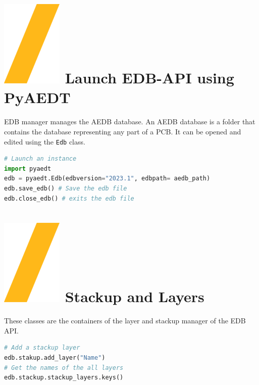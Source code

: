 \documentclass[landscape]{article}
\begin{document}
\begin{multicols}{3}
\setlength{\premulticols}{1pt}
\setlength{\postmulticols}{1pt}
\setlength{\multicolsep}{1pt}
\setlength{\columnsep}{2pt}

\section{\includegraphics[height=\fontcharht\font`\S]{slash.png} Launch EDB-API using PyAEDT}
\justifying
EDB manager manages the AEDB database. An AEDB database is a folder that contains the database representing any part of a PCB. It can be opened and edited using the \texttt{Edb} class.
\begin{lstlisting}[language=Python]
# Launch an instance
import pyaedt
edb = pyaedt.Edb(edbversion="2023.1", edbpath= aedb_path)
edb.save_edb() # Save the edb file
edb.close_edb() # exits the edb file
\end{lstlisting}

\section{\includegraphics[height=\fontcharht\font`\S]{slash.png} Stackup and Layers}
These classes are the containers of the layer and stackup manager of the EDB API.
\begin{lstlisting}[language=Python]
# Add a stackup layer
edb.stakup.add_layer("Name")
# Get the names of the all layers
edb.stackup.stackup_layers.keys()
\end{lstlisting}

\end{multicols}
\end{document}
